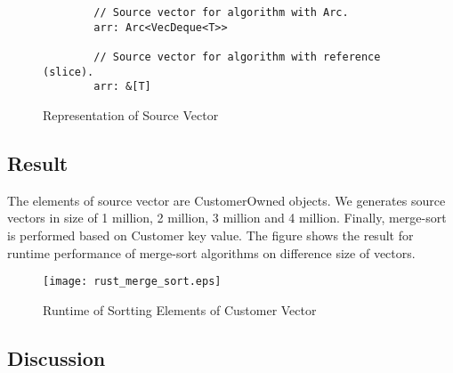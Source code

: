 \begin{figure}[htb]
    \begin{lstlisting}
        // Source vector for algorithm with Arc.
        arr: Arc<VecDeque<T>>

        // Source vector for algorithm with reference (slice).
        arr: &[T]
    \end{lstlisting}
    \caption{Representation of Source Vector}
    \label{fig:Sampling}
\end{figure}


\subsection{Result}
The elements of source vector are CustomerOwned objects. We generates source vectors in size of 1 million, 2 million, 3 million and 4 million. 
Finally, merge-sort is performed based on Customer key value. The figure shows the result for runtime performance of merge-sort algorithms on difference size of vectors.

\begin{figure}[htb]
    \texttt{[image: rust\_merge\_sort.eps]}
    \caption{Runtime of Sortting Elements of Customer Vector}
    \label{fig:Sampling}
\end{figure}

\subsection{Discussion}

